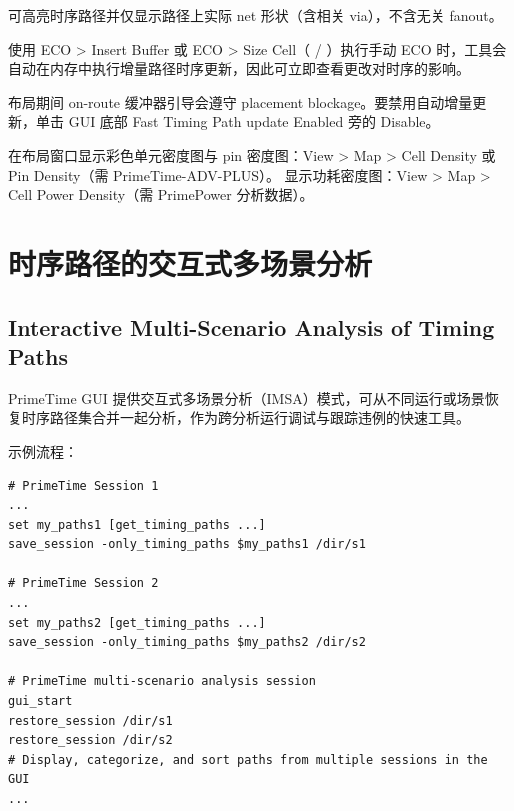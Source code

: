 可高亮时序路径并仅显示路径上实际 net 形状（含相关 via），不含无关 fanout。



使用 ECO > Insert Buffer 或 ECO > Size Cell（ / ）执行手动 ECO 时，工具会自动在内存中执行增量路径时序更新，因此可立即查看更改对时序的影响。

布局期间 on-route 缓冲器引导会遵守 placement blockage。要禁用自动增量更新，单击 GUI 底部 Fast Timing Path update Enabled 旁的 Disable。


在布局窗口显示彩色单元密度图与 pin 密度图：View > Map > Cell Density 或 Pin Density（需 PrimeTime-ADV-PLUS）。
显示功耗密度图：View > Map > Cell Power Density（需 PrimePower 分析数据）。




\section{时序路径的交互式多场景分析}
\subsection*{Interactive Multi-Scenario Analysis of Timing Paths}

PrimeTime GUI 提供交互式多场景分析（IMSA）模式，可从不同运行或场景恢复时序路径集合并一起分析，作为跨分析运行调试与跟踪违例的快速工具。

示例流程：
\begin{lstlisting}
# PrimeTime Session 1
...
set my_paths1 [get_timing_paths ...]
save_session -only_timing_paths $my_paths1 /dir/s1

# PrimeTime Session 2
...
set my_paths2 [get_timing_paths ...]
save_session -only_timing_paths $my_paths2 /dir/s2

# PrimeTime multi-scenario analysis session
gui_start
restore_session /dir/s1
restore_session /dir/s2
# Display, categorize, and sort paths from multiple sessions in the GUI
...
\end{lstlisting}

